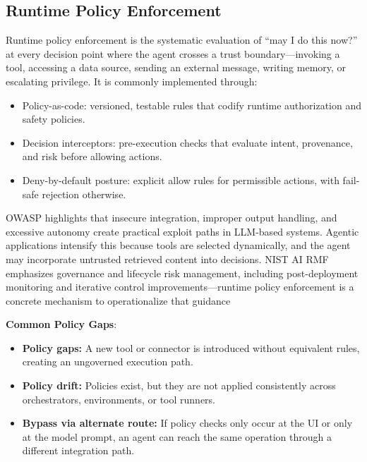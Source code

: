 \begin{TNtwocol}
    \section{Runtime Policy Enforcement}

    Runtime policy enforcement is the systematic evaluation of “may I do this now?” at every decision point where the agent crosses a trust boundary—invoking a tool, accessing a data source, sending an external message, writing memory, or escalating privilege. It is commonly implemented through:

    \begin{itemize}
        \item Policy-as-code: versioned, testable rules that codify runtime authorization and safety policies.
        \item Decision interceptors: pre-execution checks that evaluate intent, provenance, and risk before allowing actions.
        \item Deny-by-default posture: explicit allow rules for permissible actions, with fail-safe rejection otherwise.
    \end{itemize}

    OWASP highlights that insecure integration, improper output handling, and excessive autonomy create practical exploit paths in LLM-based systems.  Agentic applications intensify this because tools are selected dynamically, and the agent may incorporate untrusted retrieved content into decisions.  NIST AI RMF emphasizes governance and lifecycle risk management, including post-deployment monitoring and iterative control improvements—runtime policy enforcement is a concrete mechanism to operationalize that guidance

    \textbf{Common Policy Gaps}:

    \begin{itemize}
        \item \textbf{Policy gaps:} A new tool or connector is introduced without equivalent rules, creating an ungoverned execution path.
        \item \textbf{Policy drift:} Policies exist, but they are not applied consistently across orchestrators, environments, or tool runners.
        \item \textbf{Bypass via alternate route:} If policy checks only occur at the UI or only at the model prompt, an agent can reach the same operation through a different integration path.
    \end{itemize}


\end{TNtwocol}
